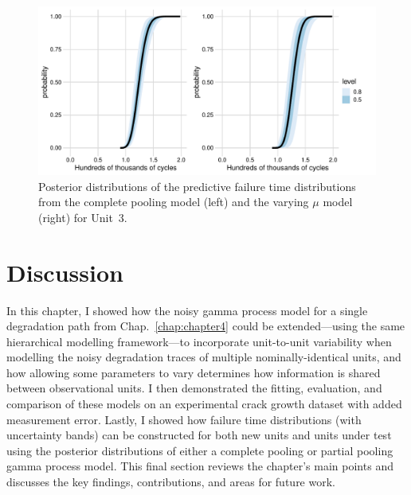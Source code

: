 \begin{figure}[h]
    \centering
    \includegraphics[width=0.95\columnwidth]{./figures/ch-5/FT_dist_Unit3.pdf}
    \caption{Posterior distributions of the predictive failure time distributions from the complete pooling model (left) and the varying $\mu$ model (right) for Unit~3.}
    \label{fig:FT_CP_VM_U3}
\end{figure}

\section{Discussion} \label{sec:unit-to-unit-discussion}

In this chapter, I showed how the noisy gamma process model for a single degradation path from Chap.~\ref{chap:chapter4} could be extended---using the same hierarchical modelling framework---to incorporate unit-to-unit variability when modelling the noisy degradation traces of multiple nominally-identical units, and how allowing some parameters to vary determines how information is shared between observational units. I then demonstrated the fitting, evaluation, and comparison of these models on an experimental crack growth dataset with added measurement error. Lastly, I showed how failure time distributions (with uncertainty bands) can be constructed for both new units and units under test using the posterior distributions of either a complete pooling or partial pooling gamma process model. This final section reviews the chapter's main points and discusses the key findings, contributions, and areas for future work.

